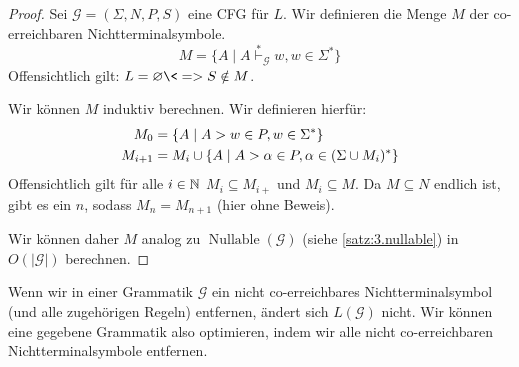 \begin{proof}
    Sei $\mathcal{G} = (\Sigma, N, P, S)$ eine \ac{CFG} für $L$.
    Wir definieren die Menge $M$ der co-erreichbaren Nichtterminalsymbole.
    $$M = \{ A \mid A \stackrel{*}{\vdash}_\mathcal{G} w, w\in \Sigma^* \}$$
    Offensichtlich gilt: $L =\varnothing \<=> S\notin M$.
    
    Wir können $M$ induktiv berechnen. Wir definieren hierfür:
	\begin{align*}
		M_0 &= \{ A \mid A \-> w\in P, w\in \Sigma^* \}\\
		M_{i+1} &= M_i\cup \{ A \mid A \-> \alpha\in P, \alpha\in(\Sigma\cup M_i)^* \}
	\end{align*}
    Offensichtlich gilt für alle $i\in\mathbb{N}$ $M_i\subseteq M_{i+}$ und $M_i\subseteq M$.
    Da $M\subseteq N$ endlich ist, gibt es ein $n$, sodass $M_n = M_{n+1}$ (hier ohne Beweis).
    
    Wir können daher $M$ analog zu $\operatorname{Nullable}(\mathcal{G})$ (siehe \autoref{satz:3.nullable}) in $O(|\mathcal{G}|)$ berechnen.
\end{proof}
\begin{Bem}
        Wenn wir in einer Grammatik $\mathcal{G}$ ein nicht co-erreichbares Nichtterminalsymbol (und alle zugehörigen Regeln) entfernen, ändert sich $L(\mathcal{G})$ nicht.
        Wir können eine gegebene Grammatik also optimieren, indem wir alle nicht co-erreichbaren Nichtterminalsymbole entfernen.
\end{Bem}



